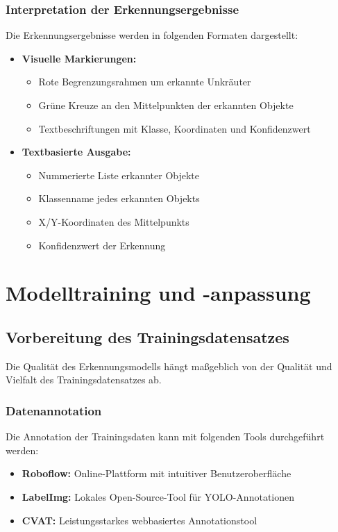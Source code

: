 \documentclass[12pt, a4paper]{scrreprt}
\begin{document}
\subsection{Interpretation der Erkennungsergebnisse}
Die Erkennungsergebnisse werden in folgenden Formaten dargestellt:
\begin{itemize}
    \item \textbf{Visuelle Markierungen:}
    \begin{itemize}
        \item Rote Begrenzungsrahmen um erkannte Unkräuter
        \item Grüne Kreuze an den Mittelpunkten der erkannten Objekte
        \item Textbeschriftungen mit Klasse, Koordinaten und Konfidenzwert
    \end{itemize}
    \item \textbf{Textbasierte Ausgabe:}
    \begin{itemize}
        \item Nummerierte Liste erkannter Objekte
        \item Klassenname jedes erkannten Objekts
        \item X/Y-Koordinaten des Mittelpunkts
        \item Konfidenzwert der Erkennung
    \end{itemize}
\end{itemize}

\chapter{Modelltraining und -anpassung}

\section{Vorbereitung des Trainingsdatensatzes}
Die Qualität des Erkennungsmodells hängt maßgeblich von der Qualität und Vielfalt des Trainingsdatensatzes ab.

\subsection{Datenannotation}
Die Annotation der Trainingsdaten kann mit folgenden Tools durchgeführt werden:
\begin{itemize}
    \item \textbf{Roboflow:} Online-Plattform mit intuitiver Benutzeroberfläche
    \item \textbf{LabelImg:} Lokales Open-Source-Tool für YOLO-Annotationen
    \item \textbf{CVAT:} Leistungsstarkes webbasiertes Annotationstool
\end{itemize}
\end{document}
